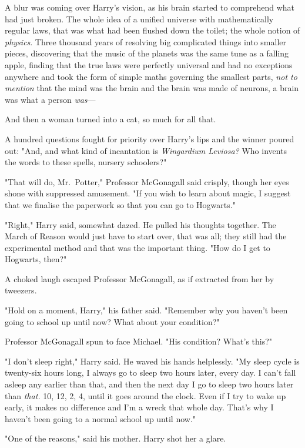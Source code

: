 A blur was coming over Harry's vision, as his brain started to comprehend what
had just broken. The whole idea of a unified universe with mathematically
regular laws, that was what had been flushed down the toilet; the whole notion
of \emph{physics}. Three thousand years of resolving big complicated things
into smaller pieces, discovering that the music of the planets was the same
tune as a falling apple, finding that the true laws were perfectly universal
and had no exceptions anywhere and took the form of simple maths governing the
smallest parts, \emph{not to mention} that the mind was the brain and the brain
was made of neurons, a brain was what a person \emph{was}---

And then a woman turned into a cat, so much for all that.

A hundred questions fought for priority over Harry's lips and the winner poured
out: "And, and what kind of incantation is \emph{Wingardium Leviosa?} Who
invents the words to these spells, nursery schoolers?"

"That will do, Mr.~Potter," Professor McGonagall said crisply, though her eyes
shone with suppressed amusement. "If you wish to learn about magic, I suggest
that we finalise the paperwork so that you can go to Hogwarts."

"Right," Harry said, somewhat dazed. He pulled his thoughts together. The March
of Reason would just have to start over, that was all; they still had the
experimental method and that was the important thing. "How do I get to
Hogwarts, then?"

A choked laugh escaped Professor McGonagall, as if extracted from her by
tweezers.

"Hold on a moment, Harry," his father said. "Remember why you haven't been
going to school up until now? What about your condition?"

Professor McGonagall spun to face Michael. "His condition? What's this?"

"I don't sleep right," Harry said. He waved his hands helplessly. "My sleep
cycle is twenty-six hours long, I always go to sleep two hours later, every
day. I can't fall asleep any earlier than that, and then the next day I go to
sleep two hours later than \emph{that.} 10\PM, 12\AM, 2\AM, 4\AM, until it goes
around the clock. Even if I try to wake up early, it makes no difference and
I'm a wreck that whole day. That's why I haven't been going to a normal school
up until now."

"One of the reasons," said his mother. Harry shot her a glare.

